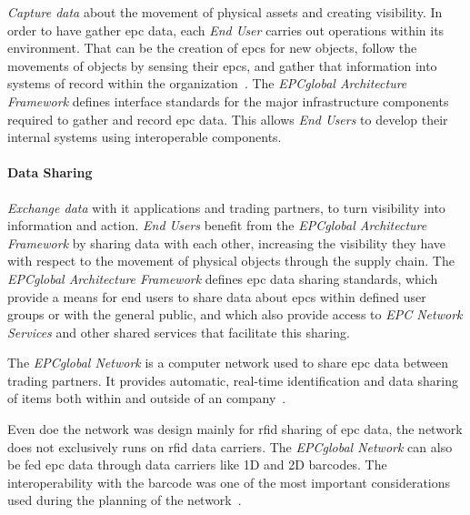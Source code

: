 \emph{Capture data} about the movement of physical assets and creating visibility.
In order to have gather \ac{epc} data, each \emph{End User} carries out operations within its environment. That can be the creation of \ac{epc}s for new objects, follow the movements of objects by sensing their \ac{epc}s, and gather that information into systems of record within the organization~\cite{Architecture6framework20140414Pdf}. The \emph{EPCglobal Architecture Framework} defines interface standards for the major infrastructure components required to gather and record \ac{epc} data. This allows \emph{End Users} to develop their internal systems using interoperable components.

\paragraph{Data Sharing} 

\emph{Exchange data} with \ac{it} applications and trading partners, to turn visibility into information and action.
\emph{End Users} benefit from the \emph{EPCglobal Architecture Framework} by sharing data with each other, increasing the visibility they have with respect to the movement of physical objects through the supply chain. 
The \emph{EPCglobal Architecture Framework} defines \ac{epc} data sharing standards, which provide a means for end users to share data about \acp{epc} within defined user groups or with the general public, and which also provide access to \emph{EPC Network Services} and other shared services that facilitate this sharing. %


The \emph{EPCglobal Network} is a computer network used to share \ac{epc} data between trading partners. 
It provides automatic, real-time identification and data sharing of items both within and outside of an company~\cite[p. 213]{lahiriRFIDSourcebook2005}.

Even doe the network was design mainly for \ac{rfid} sharing of \ac{epc} data, the network does not exclusively runs on \ac{rfid} data carriers. The \emph{EPCglobal Network} can also be fed \ac{epc} data through data carriers like 1D and 2D barcodes. The interoperability with the barcode was one of the most important considerations used during the planning of the network~\cite{RFIDBarcodeInteroperability}.



